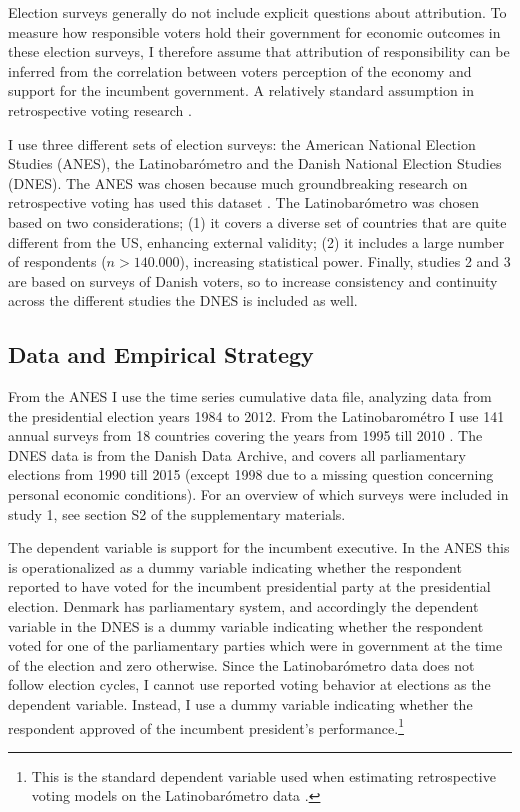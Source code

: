 \documentclass[a4paper,11pt]{article}
\begin{document}
	
	
	
	Election surveys generally do not include explicit questions about attribution. To measure how responsible voters hold their government for economic outcomes in these election surveys, I therefore assume that attribution of responsibility can be inferred from the correlation between voters perception of the economy and support for the incumbent government. A relatively standard assumption in retrospective voting research \citep[e.g.,][]{carlin2015executive,lewis2013vp,duch2008economic}.
	
	I use three different sets of election surveys: the American National Election Studies (ANES), the Latinobarómetro and the Danish National Election Studies (DNES). The ANES was chosen because much groundbreaking research on retrospective voting has used this dataset \citep[e.g.][]{fiorina1981retrospective}. The Latinobarómetro was chosen based on two considerations; (1) it covers a diverse set of countries that are quite different from the US, enhancing external validity; (2) it includes a large number of respondents ($n>140.000$), increasing statistical power. Finally, studies 2 and 3 are based on surveys of Danish voters, so to increase consistency and continuity across the different studies the DNES is included as well.
	
	
	
	
	\subsection*{Data and Empirical Strategy}
	From the ANES I use the time series cumulative data file, analyzing data from the presidential election years 1984 to 2012. From the Latinobarométro I use 141 annual surveys from 18 countries covering the years from 1995 till 2010 \cite[our starting point is the  dataset used in][]{carlin2015executive}. The DNES data is from the Danish Data Archive, and covers all parliamentary elections from 1990 till  2015 (except 1998 due to a missing question concerning personal economic conditions). For an overview of which surveys were included in study 1, see section S2 of the supplementary materials.
	
	The dependent variable is support for the incumbent executive. In the ANES this is operationalized as a dummy variable indicating whether the respondent reported to have voted for the incumbent presidential party at the presidential election. Denmark has  parliamentary system, and accordingly the dependent variable in the DNES is a dummy variable indicating whether the respondent voted for one of the parliamentary parties which were in government at the time of the election and zero otherwise. Since the Latinobarómetro data does not follow election cycles, I cannot use reported voting behavior at elections as the dependent variable. Instead, I use a dummy variable indicating whether the respondent approved of the incumbent president's performance.\footnote{This is the standard dependent variable used when estimating retrospective voting models on the Latinobarómetro data \citep{carlin2015executive}.} 
	
\end{document}
